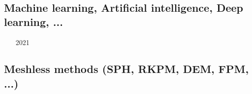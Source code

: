 \begin{scriptsize}
\begin{itemize}
\item[\twothousandnineteen] 
\textcite{begb19} \\
\textcite{wihb19} \\
\textcite{huzl19} \\
\textcite{panm19} \\
\textcite{hall19} \\
\item[\twothousandtwenty] 
\textcite{hemn20} \\
\item[\twothousandtwentyone] 
\textcite{fabh21} 
\end{itemize}
\end{scriptsize}

\subsection{Machine learning, Artificial intelligence, Deep learning, ...}

\begin{scriptsize}
\begin{itemize}
\item[2021] \textcite{agtk21} 
\end{itemize}
\end{scriptsize}

\subsection{Meshless methods (SPH, RKPM, DEM, FPM, ...)}

